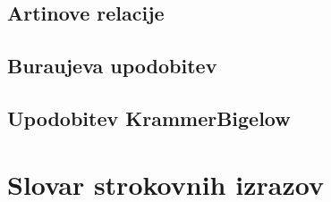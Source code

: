 \documentclass[mat1]{fmfdelo}
\begin{document}
\subsection{Artinove relacije}

\subsection{Buraujeva upodobitev}

\subsection{Upodobitev Krammer\-Bigelow}





\section*{Slovar strokovnih izrazov}

\geslo{}{}


\begin{thebibliography}{99}


\end{thebibliography}
\end{document}

